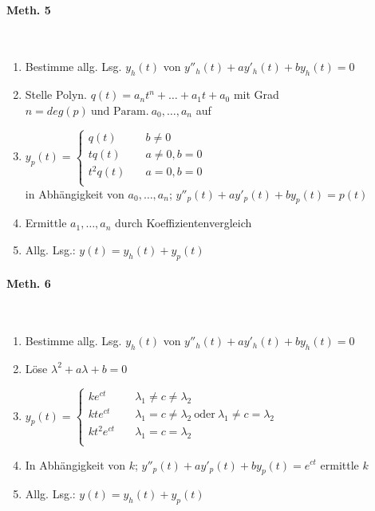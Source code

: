 \documentclass[paper=a3,paper=landscape, fontsize=9pt,DIV=30]{scrartcl}
\begin{document}
\begin{multicols*}{4}
  \paragraph{Meth. 5}\hspace{0pt}\\
  \begin{enumerate}
  	\item Bestimme allg. Lsg. $y_h(t)$ von $y''_h(t)+ay'_h(t)+by_h(t)=0$
  	\item Stelle Polyn. $q(t)=a_nt^n+\dots+a_1t+a_0$ mit Grad $n=deg(p) \ \text{und Param.}\ a_0,\dots,a_n$ auf
  	\item $y_p(t) =
  	\begin{cases}
  		q(t)    & \quad b \neq 0 \\
  		tq(t)   & \quad a \neq 0, b = 0\\
  		t^2q(t) & \quad a = 0, b = 0\\
  	\end{cases}
  	$\\
  in Abhängigkeit von $a_0,\dots ,a_n$;
  $y''_p(t)+ay'_p(t)+by_p(t)=p(t)$
 \item Ermittle $a_1,\dots,a_n$ durch Koeffizientenvergleich
 \item Allg. Lsg.: $y(t)=y_h(t)+y_p(t)$
  \end{enumerate}

    \paragraph{Meth. 6}\hspace{0pt}\\
    \begin{enumerate}
    	\item Bestimme allg. Lsg. $y_h(t)$ von $y''_h(t)+ay'_h(t)+by_h(t)=0$
    \item Löse $\lambda^2+a\lambda+b=0$
    \item $y_p(t) =
    \begin{cases}
    ke^{ct}    & \quad \lambda_1 \neq c \neq \lambda_2 \\
    kte^{ct}   & \quad \lambda_1 = c \neq \lambda_2 \ \text{oder}\ \lambda_1 \neq c = \lambda_2 \\
    kt^2e^{ct} & \quad  \lambda_1 = c = \lambda_2 \\
    \end{cases}
    $
    \item In Abhängigkeit von $k$;
    $y''_p(t)+ay'_p(t)+by_p(t)=e^{ct}$
    ermittle $k$
    \item Allg. Lsg.: $y(t)=y_h(t)+y_p(t)$
    \end{enumerate}


\end{multicols*}
\end{document}
